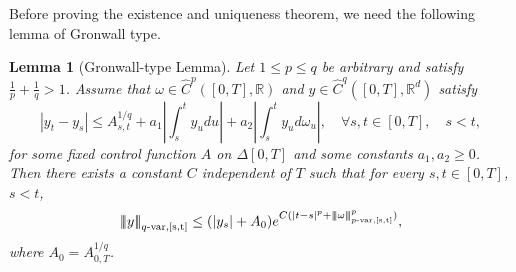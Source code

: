 \documentclass[10pt]{article}
\numberwithin{equation}{section} %
\newcommand{\R}{\ensuremath{\mathbb{R}}}
\newcommand{\ltn}{\ensuremath{\left| \! \left| \! \left|}}
\newcommand{\rtn}{\ensuremath{\right| \! \right| \! \right|}}
\newtheorem{lemma}[theorem]{Lemma}
\begin{document}
Before proving the existence and uniqueness theorem, we need the following lemma of Gronwall type.
\begin{lemma}[Gronwall-type Lemma]\label{lemma6}
Let $1\leq p\leq q$ be arbitrary and satisfy $\frac{1}{p}+\frac{1}{q}>1$.  Assume that $\omega \in \widehat{C}^p([0,T],\R)$ and $y\in \widehat{C}^{q}([0,T],\R^d)$ satisfy
\begin{equation}\label{condition1}
|y_t-y_s|\leq A_{s,t}^{1/q} + a_1\left |\int_s^t y_udu \right | + a_2\left |\int_s^t y_ud\omega_u\right |,\quad\forall s,t\in [0,T],\quad s<t, 
\end{equation}
 for some fixed control function $A$ on $\Delta[0,T]$ and some constants $a_1, a_2 \geq 0$. Then there exists a constant  $C$ independent of $T$ such that for every $s,t \in [0,T]$, $s<t$,
 \begin{eqnarray}\label{eqn.gron}
\ltn y\rtn_{q\text{-}\rm{var},[s,t]} \leq (|y_s| + A_0) e^{C(|t-s|^p+ \ltn\omega\rtn_{p\text{-}\rm{var},[s,t]}^{p})},
\end{eqnarray}
where $A_0 =A_{0,T}^{1/q}$.
\end{lemma}
\end{document}
